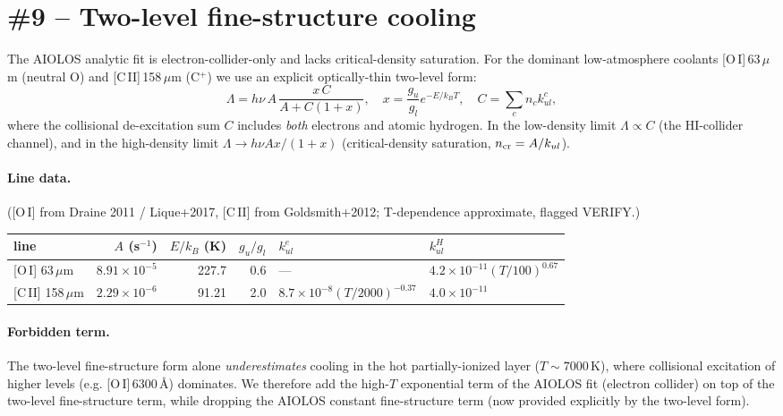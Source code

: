\documentclass[english,a4paper]{kiseon_memo}
\begin{document}
\section{\#9 -- Two-level fine-structure cooling}

The AIOLOS analytic fit is electron-collider-only and lacks
critical-density saturation.  For the dominant low-atmosphere coolants
[O\,I]\,63\,$\mu$m (neutral O) and [C\,II]\,158\,$\mu$m (C$^+$) we use an
explicit optically-thin two-level form:
\[
  \Lambda = h\nu\,A\,\frac{x\,C}{A + C(1+x)},\quad
  x = \frac{g_u}{g_l}e^{-E/k_BT},\quad
  C = \sum_c n_c k_{ul}^c,
\]
where the collisional de-excitation sum $C$ includes \emph{both}
electrons and atomic hydrogen.  In the low-density limit $\Lambda \propto
C$ (the HI-collider channel), and in the high-density limit
$\Lambda \to h\nu A x/(1+x)$ (critical-density saturation,
$n_{\rm cr} = A/k_{ul}$).

\paragraph{Line data.} ([O\,I] from Draine 2011 / Lique+2017,
[C\,II] from Goldsmith+2012; T-dependence approximate, flagged VERIFY.)
\begin{center}
\begin{tabular}{lrrrll}
\toprule
line & $A$ (s$^{-1}$) & $E/k_B$ (K) & $g_u/g_l$ & $k^e_{ul}$ & $k^H_{ul}$ \\
\midrule
{}[O\,I] 63\,$\mu$m  & $8.91\!\times\!10^{-5}$ & 227.7 & 0.6 & --- & $4.2\!\times\!10^{-11}(T/100)^{0.67}$ \\
{}[C\,II] 158\,$\mu$m & $2.29\!\times\!10^{-6}$ & 91.21 & 2.0 & $8.7\!\times\!10^{-8}(T/2000)^{-0.37}$ & $4.0\!\times\!10^{-11}$ \\
\bottomrule
\end{tabular}
\end{center}

\paragraph{Forbidden term.} The two-level fine-structure form alone
\emph{underestimates} cooling in the hot partially-ionized layer
($T\sim7000$\,K), where collisional excitation of higher levels (e.g.
[O\,I]\,6300\,\AA) dominates.  We therefore add the high-$T$ exponential
term of the AIOLOS fit (electron collider) on top of the two-level
fine-structure term, while dropping the AIOLOS constant fine-structure
term (now provided explicitly by the two-level form).
\end{document}
